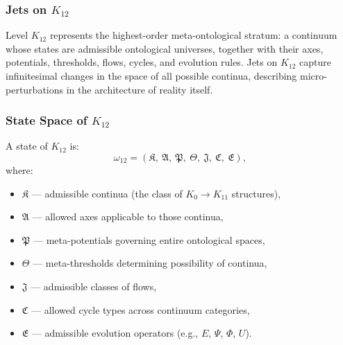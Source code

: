 
\subsubsection{Jets on $K_{12}$}
\label{sec:jets-k12}

Level $K_{12}$ represents the highest-order meta-ontological stratum:
a continuum whose states are admissible ontological universes,
together with their axes, potentials, thresholds, flows, cycles, and
evolution rules. Jets on $K_{12}$ capture infinitesimal changes in the
space of all possible continua, describing micro-perturbations in the
architecture of reality itself.


\subsubsection{State Space of $K_{12}$}

A state of $K_{12}$ is:
\[
\omega_{12} =
(\mathfrak{K},\ \mathfrak{A},\ \mathfrak{P},\ \mathfrak{\Theta},\ 
 \mathfrak{J},\ \mathfrak{C},\ \mathfrak{E}),
\]
where:
\begin{itemize}
    \item $\mathfrak{K}$ — admissible continua (the class of $K_0\!\to\!K_{11}$ structures),
    \item $\mathfrak{A}$ — allowed axes applicable to those continua,
    \item $\mathfrak{P}$ — meta-potentials governing entire ontological spaces,
    \item $\mathfrak{\Theta}$ — meta-thresholds determining possibility of continua,
    \item $\mathfrak{J}$ — admissible classes of flows,
    \item $\mathfrak{C}$ — allowed cycle types across continuum categories,
    \item $\mathfrak{E}$ — admissible evolution operators (e.g., $E$, $\Psi$, $\Phi$, $U$).
\end{itemize}


